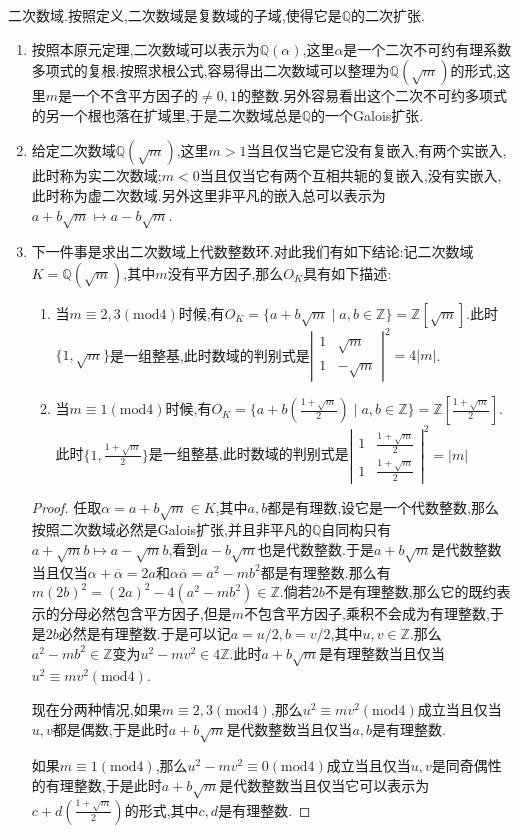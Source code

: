 二次数域.按照定义,二次数域是复数域的子域,使得它是$\mathbb{Q}$的二次扩张.
\begin{enumerate}
	\item 按照本原元定理,二次数域可以表示为$\mathbb{Q}(\alpha)$,这里$\alpha$是一个二次不可约有理系数多项式的复根.按照求根公式,容易得出二次数域可以整理为$\mathbb{Q}(\sqrt{m})$的形式,这里$m$是一个不含平方因子的$\not=0,1$的整数.另外容易看出这个二次不可约多项式的另一个根也落在扩域里,于是二次数域总是$\mathbb{Q}$的一个Galois扩张.
	\item 给定二次数域$\mathbb{Q}(\sqrt{m})$,这里$m>1$当且仅当它是它没有复嵌入,有两个实嵌入,此时称为实二次数域;$m<0$当且仅当它有两个互相共轭的复嵌入,没有实嵌入,此时称为虚二次数域.另外这里非平凡的嵌入总可以表示为$a+b\sqrt{m}\mapsto a-b\sqrt{m}$.
	\item 下一件事是求出二次数域上代数整数环.对此我们有如下结论:记二次数域$K=\mathbb{Q}(\sqrt{m})$,其中$m$没有平方因子,那么$O_K$具有如下描述:
	\begin{enumerate}
		\item 当$m\equiv2,3(\mathrm{mod}4)$时候,有$O_K=\{a+b\sqrt{m}\mid a,b\in\mathbb{Z}\}=\mathbb{Z}[\sqrt{m}]$.此时$\{1,\sqrt{m}\}$是一组整基,此时数域的判别式是$\left|\begin{array}{cc}1&\sqrt{m}\\1&-\sqrt{m}\end{array}\right|^2=4|m|$.
		\item 当$m\equiv1(\mathrm{mod}4)$时候,有$O_K=\{a+b\left(\frac{1+\sqrt{m}}{2}\right)\mid a,b\in\mathbb{Z}\}=\mathbb{Z}[\frac{1+\sqrt{m}}{2}]$.此时$\{1,\frac{1+\sqrt{m}}{2}\}$是一组整基,此时数域的判别式是$\left|\begin{array}{cc}1&\frac{1+\sqrt{m}}{2}\\1&\frac{1+\sqrt{m}}{2}\end{array}\right|^2=|m|$
	\end{enumerate}
	\begin{proof}
		
		任取$\alpha=a+b\sqrt{m}\in K$,其中$a,b$都是有理数,设它是一个代数整数,那么按照二次数域必然是Galois扩张,并且非平凡的$\mathbb{Q}$自同构只有$a+\sqrt{m}b\mapsto a-\sqrt{m}b$,看到$a-b\sqrt{m}$也是代数整数.于是$a+b\sqrt{m}$是代数整数当且仅当$\alpha+\overline{\alpha}=2a$和$\alpha\overline{\alpha}=a^2-mb^2$都是有理整数.那么有$m(2b)^2=(2a)^2-4(a^2-mb^2)\in\mathbb{Z}$.倘若$2b$不是有理整数,那么它的既约表示的分母必然包含平方因子,但是$m$不包含平方因子,乘积不会成为有理整数,于是$2b$必然是有理整数.于是可以记$a=u/2,b=v/2$,其中$u,v\in\mathbb{Z}$.那么$a^2-mb^2\in\mathbb{Z}$变为$u^2-mv^2\in4\mathbb{Z}$.此时$a+b\sqrt{m}$是有理整数当且仅当$u^2\equiv mv^2(\mathrm{mod}4)$.
		
		现在分两种情况,如果$m\equiv2,3(\mathrm{mod}4)$,那么$u^2\equiv mv^2(\mathrm{mod}4)$成立当且仅当$u,v$都是偶数,于是此时$a+b\sqrt{m}$是代数整数当且仅当$a,b$是有理整数.
		
		如果$m\equiv1(\mathrm{mod}4)$,那么$u^2-mv^2\equiv0(\mathrm{mod}4)$成立当且仅当$u,v$是同奇偶性的有理整数,于是此时$a+b\sqrt{m}$是代数整数当且仅当它可以表示为$c+d\left(\frac{1+\sqrt{m}}{2}\right)$的形式,其中$c,d$是有理整数.
	\end{proof}
\end{enumerate}

